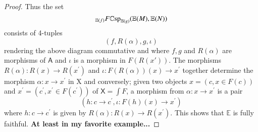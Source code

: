 \documentclass{amsart}
\begin{document}
\begin{proof}
Thus the set $$_{\mathbb{E}(f)} {F\mathbb{C}\textnormal{sp}}_{\mathbb{E}(g)}(\mathbb{E}(M),\mathbb{E}(N))$$ consists of 4-tuples $$(f,R(\alpha),g,\iota)$$ rendering the above diagram commutative and where $f,g$ and $R(\alpha)$ are morphisms of $\mathsf{A}$ and $\iota$ is a morphism in $F(R(x'))$. The morphisms $R(\alpha) \colon R(x) \to R(x^\prime)$ and $\iota \colon F(R(\alpha))(x) \to x^\prime$ together determine the morphism $\alpha \colon x \to x^\prime$ in $\mathrm{X}$ and conversely; given two objects $x=(c,x \in F(c))$ and $x^\prime=(c^\prime,x^\prime \in F(c^\prime))$ of $\mathsf{X}=\int{F}$, a morphism from $\alpha \colon x \to x^\prime$ is a pair $$(h \colon c \to c^\prime, \iota \colon F(h)(x) \to x^\prime)$$ where $h \colon c \to c^\prime$ is given by $R(\alpha) \colon R(x) \to R(x^\prime)$. This shows that $\mathbb{E}$ is fully faithful. \textbf{At least in my favorite example...}


\end{proof}
\end{document}
